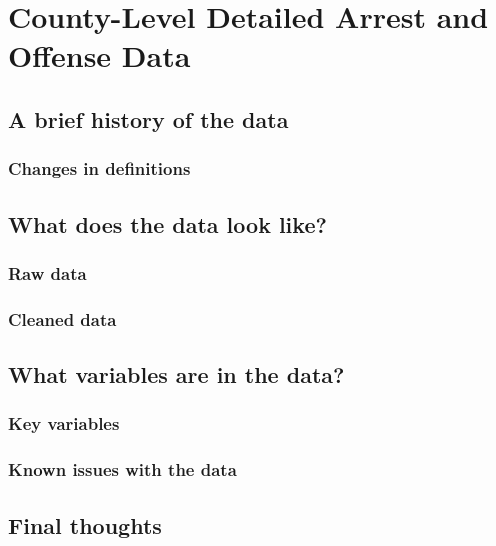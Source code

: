 \documentclass[
  12pt,
  openany]{book}
\begin{document}
\hypertarget{county_level}{%
\chapter{County-Level Detailed Arrest and Offense Data}\label{county_level}}

\hypertarget{a-brief-history-of-the-data-3}{%
\section{A brief history of the data}\label{a-brief-history-of-the-data-3}}

\hypertarget{changes-in-definitions-3}{%
\subsection{Changes in definitions}\label{changes-in-definitions-3}}

\hypertarget{what-does-the-data-look-like-3}{%
\section{What does the data look like?}\label{what-does-the-data-look-like-3}}

\hypertarget{raw-data-2}{%
\subsection{Raw data}\label{raw-data-2}}

\hypertarget{cleaned-data}{%
\subsection{Cleaned data}\label{cleaned-data}}

\hypertarget{what-variables-are-in-the-data-3}{%
\section{What variables are in the data?}\label{what-variables-are-in-the-data-3}}

\hypertarget{key-variables-3}{%
\subsection{Key variables}\label{key-variables-3}}

\hypertarget{known-issues-with-the-data-3}{%
\subsection{Known issues with the data}\label{known-issues-with-the-data-3}}

\hypertarget{final-thoughts-3}{%
\section{Final thoughts}\label{final-thoughts-3}}

\backmatter

  
\end{document}
